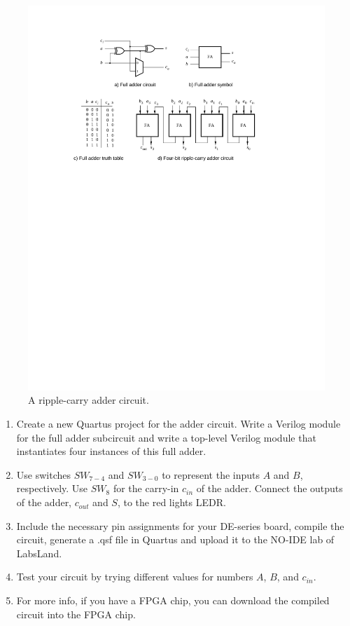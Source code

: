 \documentclass[epsfig,10pt,fullpage]{article}
\begin{document}
\begin{figure}[H]
	\begin{center}
		\includegraphics[]{figures/figure2.pdf}
	\end{center}
\caption{A ripple-carry adder circuit.}
\label{fig:fig2}
\end{figure}

\begin{enumerate}
\item Create a new Quartus project for the adder circuit. Write a Verilog module
for the full adder subcircuit and write a top-level Verilog module that instantiates four 
instances of this full adder.
\item Use switches $SW_{7-4}$ and $SW_{3-0}$ to represent the inputs $A$ and $B$, respectively.
Use $SW_{8}$ for the carry-in $c_{in}$ of the adder. Connect the outputs of the adder, 
$c_{out}$ and $S$, to the red lights LEDR.
\item Include the necessary pin assignments for your DE-series board, compile the circuit, generate a .qsf file in Quartus and upload it to the NO-IDE lab of LabsLand.
\item Test your circuit by trying different values for numbers $A$, $B$, and $c_{in}$.
\item For more info, if you have a FPGA chip, you can download the compiled circuit into the FPGA chip.
\end{enumerate}
\end{document}
